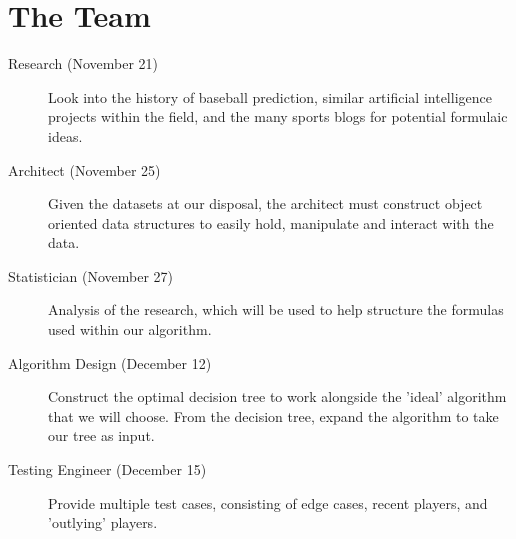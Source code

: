 \documentclass[paper=a4, fontsize=11pt]{scrartcl} %
\numberwithin{equation}{section} %
\numberwithin{figure}{section} %
\numberwithin{table}{section} %
\begin{document}
\section*{The Team}
\begin{description}
\item[Research (November 21)] Look into the history of baseball prediction, similar artificial intelligence projects within the field, and the many sports blogs for potential formulaic ideas.
\item[Architect (November 25)] Given the datasets at our disposal, the architect must construct object oriented data structures to easily hold, manipulate and interact with the data.
\item[Statistician (November 27)] Analysis of the research, which will be used to help structure the formulas used within our algorithm.
\item[Algorithm Design (December 12)] Construct the optimal decision tree to work alongside the 'ideal' algorithm that we will choose. From the decision tree, expand the algorithm to take our tree as input.
\item[Testing Engineer (December 15)] Provide multiple test cases, consisting of edge cases, recent players, and 'outlying' players.
\end{description}






\end{document}
